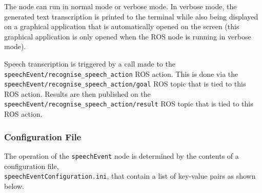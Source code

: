 \documentclass{CSSRforAfrica}
\begin{document}
{{The node can run in normal mode or verbose mode. In verbose mode, the generated text transcription is printed to the terminal while also being displayed on a graphical application that is automatically opened on the screen (this graphical application is only opened when the ROS node is running in verbose mode).

Speech transcription is triggered by a call made to the {\small \verb+speechEvent/recognise_speech_action+} ROS action. This is done via the {\small \verb+speechEvent/recognise_speech_action/goal+} ROS topic that is tied to this ROS action. Results are then published on the \\{\small \verb+speechEvent/recognise_speech_action/result+} ROS topic that is tied to this ROS action.

\subsubsection*{Configuration File}

The operation of the {\small \verb+speechEvent+} node is determined by the contents of a configuration file, \\
{\small \verb+speechEventConfiguration.ini+}, that  contain a list of key-value pairs as shown below.  

}}
\end{document}
